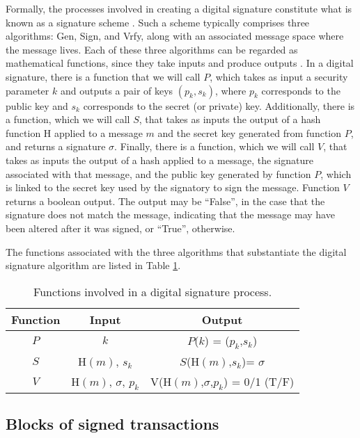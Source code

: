 \documentclass[nofootinbib,aps,prd,reprint,superscriptaddress,floatfix]{revtex4-2}
\begin{document}
Formally, the processes involved in creating a digital signature constitute what is known as a signature scheme \cite{Digital_signatures}. Such a scheme typically comprises three algorithms: Gen, Sign, and Vrfy, along with an associated message space where the message lives. Each of these three algorithms can be regarded as mathematical functions, since they take inputs and produce outputs \cite{Ex_cryptography_1,Ex_cryptography_2}. In a digital signature, there is a function that we will call $P$, which takes as input a security parameter $k$ and outputs a pair of keys $(p_{k},s_{k})$, where $p_{k}$ corresponds to the public key and $s_{k}$ corresponds to the secret (or private) key. Additionally, there is a function, which we will call $S$, that takes as inputs the output of a hash function $\mathrm{H}$ applied to a message $m$ and the secret key generated from function $P$, and returns a signature $\sigma$. Finally, there is a function, which we will call $V$, that takes as inputs the output of a hash applied to a message, the signature associated with that message, and the public key generated by function $P$, which is linked to the secret key used by the signatory to sign the message. Function $V$ returns a boolean output. The output may be ``False'', in the case that the signature does not match the message, indicating that the message may have been altered after it was signed, or ``True'', otherwise. 

The functions associated with the three algorithms that substantiate the digital signature algorithm are listed in Table \ref{tab:Cryptograpic_functions}.

\begin{table}[hbtp]
    \caption{Functions involved in a digital signature process.}
    \centering
    \begin{tabular}{|c|c|c|}
    \hline
        \textbf{Function} & \textbf{Input} & \textbf{Output} \\ \hline
        $P$ & $k$ & $P$($k$) = ($p_{k}$,$s_{k}$) \\ \hline
        $S$ & $\mathrm{H}(m)$, $s_{k}$ & $S$($\mathrm{H}(m)$,$s_{k}$)= $\sigma$ \\ \hline
        $V$ & $\mathrm{H}(m)$, $\sigma$, $p_{k}$ & V($\mathrm{H}(m)$,$\sigma$,$p_{k}$) = 0/1 (T/F)\\ \hline
    \end{tabular}
    \label{tab:Cryptograpic_functions}
\end{table}

\subsection{Blocks of signed transactions}
\end{document}
